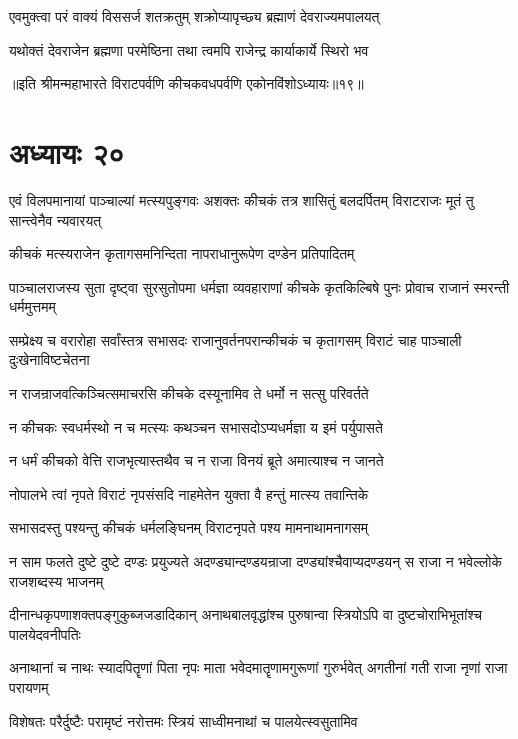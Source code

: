 \twolineshloka
{एवमुक्त्वा परं वाक्यं विससर्ज शतक्रतुम्}
{शक्रोप्यापृच्छ्य ब्रह्माणं देवराज्यमपालयत्}


\twolineshloka
{यथोक्तं देवराजेन ब्रह्मणा परमेष्ठिना}
{तथा त्वमपि राजेन्द्र कार्याकार्ये स्थिरो भव}

॥इति श्रीमन्महाभारते विराटपर्वणि कीचकवधपर्वणि एकोनविंशोऽध्यायः॥१९॥

\chapter{अध्यायः २०}

\threelineshloka
{एवं विलपमानायां पाञ्चाल्यां मत्स्यपुङ्गवः}
{अशक्तः कीचकं तत्र शासितुं बलदर्पितम्}
{विराटराजः मूतं तु सान्त्वेनैव न्यवारयत्}


\twolineshloka
{कीचकं मत्स्यराजेन कृतागसमनिन्दिता}
{नापराधानुरूपेण दण्डेन प्रतिपादितम्}


\threelineshloka
{पाञ्चालराजस्य सुता दृष्ट्वा सुरसुतोपमा}
{धर्मज्ञा व्यवहाराणां कीचके कृतकिल्बिषे}
{पुनः प्रोवाच राजानं स्मरन्ती धर्ममुत्तमम्}


\threelineshloka
{सम्प्रेक्ष्य च वरारोहा सर्वांस्तत्र सभासदः}
{राजानुवर्तनपरान्कीचकं च कृतागसम्}
{विराटं चाह पाञ्चाली दुःखेनाविष्टचेतना}


\twolineshloka
{न राजन्राजवत्किञ्चित्समाचरसि कीचके}
{दस्यूनामिव ते धर्मो न सत्सु परिवर्तते}


\twolineshloka
{न कीचकः स्वधर्मस्थो न च मत्स्यः कथञ्चन}
{सभासदोऽप्यधर्मज्ञा य इमं पर्युपासते}


\twolineshloka
{न धर्मं कीचको वेत्ति राजभृत्यास्तथैव च}
{न राजा विनयं ब्रूते अमात्याश्च न जानते}


\twolineshloka
{नोपालभे त्वां नृपते विराटं नृपसंसदि}
{नाहमेतेन युक्ता वै हन्तुं मात्स्य तवान्तिके}


\twolineshloka
{सभासदस्तु पश्यन्तु कीचकं धर्मलङ्घिनम्}
{विराटनृपते पश्य मामनाथामनागसम्}


\onelineshloka
{न साम फलते दुष्टे दुष्टे दण्डः प्रयुज्यते}
\twolineshloka
{अदण्ड्यान्दण्डयन्राजा दण्ड्यांश्चैवाप्यदण्डयन्}
{स राजा न भवेल्लोके राजशब्दस्य भाजनम्}


\threelineshloka
{दीनान्धकृपणाशक्तपङ्गुकुब्जजडादिकान्}
{अनाथबालवृद्धांश्च पुरुषान्वा स्त्रियोऽपि वा}
{दुष्टचोराभिभूतांश्च पालयेदवनीपतिः}


\threelineshloka
{अनाथानां च नाथः स्यादपितॄणां पिता नृपः}
{माता भवेदमातॄणामगुरूणां गुरुर्भवेत्}
{अगतीनां गती राजा नृणां राजा परायणम्}


\twolineshloka
{विशेषतः परैर्दुष्टैः परामृष्टं नरोत्तमः}
{स्त्रियं साध्वीमनाथां च पालयेत्स्वसुतामिव}


